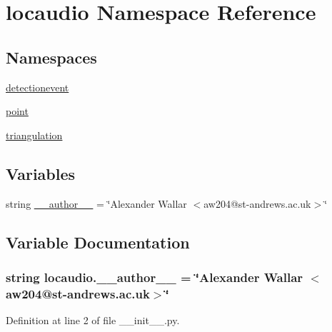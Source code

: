 \hypertarget{namespacelocaudio}{\section{locaudio Namespace Reference}
\label{namespacelocaudio}
}
\subsection*{Namespaces}
\begin{DoxyCompactItemize}
\item 
\hyperlink{namespacelocaudio_1_1detectionevent}{detectionevent}
\item 
\hyperlink{namespacelocaudio_1_1point}{point}
\item 
\hyperlink{namespacelocaudio_1_1triangulation}{triangulation}
\end{DoxyCompactItemize}
\subsection*{Variables}
\begin{DoxyCompactItemize}
\item 
string \hyperlink{namespacelocaudio_a08bd2e574ba3b2af29ee1231a056dcc5}{\-\_\-\-\_\-author\-\_\-\-\_\-} = \char`\"{}Alexander Wallar $<$aw204@st-\/andrews.\-ac.\-uk$>$\char`\"{}
\end{DoxyCompactItemize}


\subsection{Variable Documentation}
\hypertarget{namespacelocaudio_a08bd2e574ba3b2af29ee1231a056dcc5}{
\subsubsection[{\-\_\-\-\_\-author\-\_\-\-\_\-}]{\setlength{\rightskip}{0pt plus 5cm}string locaudio.\-\_\-\-\_\-author\-\_\-\-\_\- = \char`\"{}Alexander Wallar $<$aw204@st-\/andrews.\-ac.\-uk$>$\char`\"{}}}\label{namespacelocaudio_a08bd2e574ba3b2af29ee1231a056dcc5}


Definition at line 2 of file \-\_\-\-\_\-init\-\_\-\-\_\-.\-py.

